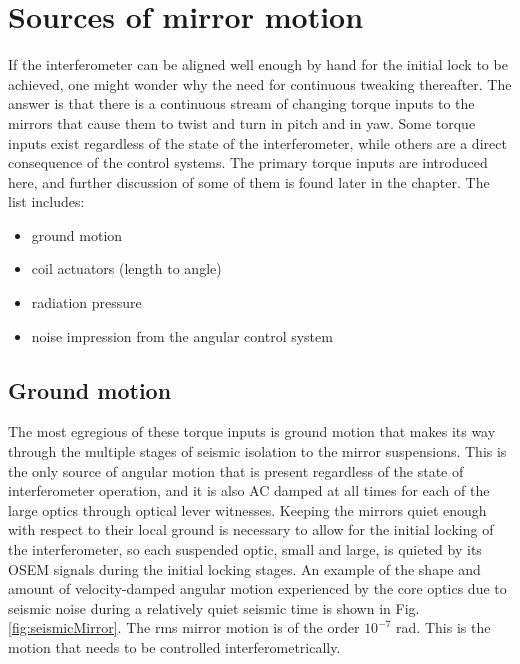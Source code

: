 \section{Sources of mirror motion}
If the interferometer can be aligned well enough by hand for the initial lock to be achieved, one might wonder why the need for continuous tweaking thereafter. The answer is that there is a continuous stream of changing torque inputs to the mirrors that cause them to twist and turn in pitch and in yaw. Some torque inputs exist regardless of the state of the interferometer, while others are a direct consequence of the control systems. The primary torque inputs are introduced here, and further discussion of some of them is found later in the chapter. The list includes:
\begin{itemize}
\item ground motion \vspace{-10pt}
\item coil actuators (length to angle) \vspace{-10pt}
\item radiation pressure \vspace{-10pt}
\item noise impression from the angular control system 
\end{itemize}


\subsection{Ground motion} 
The most egregious of these torque inputs is ground motion that makes its way through the multiple stages of seismic isolation to the mirror suspensions. This is the only source of angular motion that is present regardless of the state of interferometer operation, and it is also AC damped at all times for each of the large optics through optical lever witnesses. Keeping the mirrors quiet enough with respect to their local ground is necessary to allow for the initial locking of the interferometer, so each suspended optic, small and large, is quieted by its OSEM signals during the initial locking stages. An example of the shape and amount of velocity-damped angular motion experienced by the core optics due to seismic noise during a relatively quiet seismic time is shown in Fig. \ref{fig:seismicMirror}. The rms mirror motion is of the order $10^{-7}$ rad. This is the motion that needs to be controlled interferometrically. 

